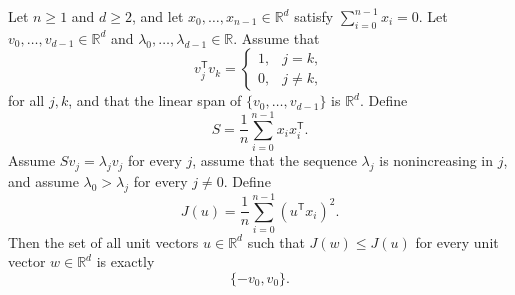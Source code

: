 \begin{theorem}
Let $n\geq1$ and $d\geq2$, and let
$x_0,\ldots,x_{n-1}\in\mathbb R^d$ satisfy
$\sum_{i=0}^{n-1}x_i=0$.  Let $v_0,\ldots,v_{d-1}\in\mathbb R^d$ and
$\lambda_0,\ldots,\lambda_{d-1}\in\mathbb R$.  Assume that
\[
  v_j^{\mathsf T}v_k=
  \begin{cases}1,&j=k,\\0,&j\ne k,\end{cases}
\]
for all $j,k$, and that the linear span of $\{v_0,\ldots,v_{d-1}\}$ is
$\mathbb R^d$.  Define
\[
  S=\frac1n\sum_{i=0}^{n-1}x_i x_i^{\mathsf T}.
\]
Assume $Sv_j=\lambda_jv_j$ for every $j$, assume that the sequence
$\lambda_j$ is nonincreasing in $j$, and assume
$\lambda_0>\lambda_j$ for every $j\ne0$.  Define
\[
  J(u)=\frac1n\sum_{i=0}^{n-1}(u^{\mathsf T}x_i)^2.
\]
Then the set of all unit vectors $u\in\mathbb R^d$ such that
$J(w)\leq J(u)$ for every unit vector $w\in\mathbb R^d$ is exactly
\[
  \{-v_0,v_0\}.
\]
\end{theorem}
